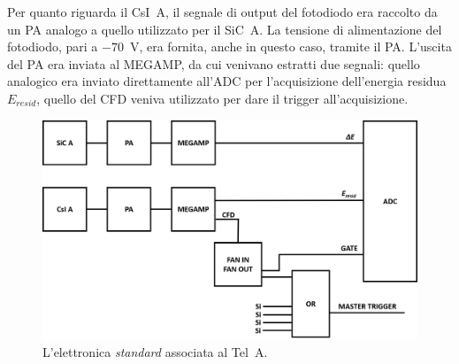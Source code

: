 Per quanto riguarda il CsI~A, il segnale di output del fotodiodo era raccolto da un PA analogo a quello utilizzato per il SiC~A.
La tensione di alimentazione del fotodiodo, pari a $-70$~V, era fornita, anche in questo caso, tramite il PA.
L'uscita del PA era inviata al MEGAMP, da cui venivano estratti due segnali: quello analogico era inviato direttamente all'ADC per l'acquisizione dell'energia residua $E_{resid}$, quello del CFD veniva utilizzato per dare il trigger all'acquisizione.

\begin{figure} [!p]
	\centering
	\includegraphics[width=\textwidth, keepaspectratio]{Grafici/elettronica_standard.png}
	\caption{L'elettronica \emph{standard} associata al Tel~A.} \label{fig:elettronica_standard}
\end{figure}



